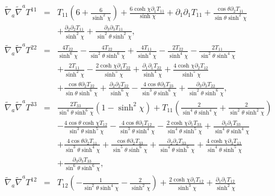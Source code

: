 \begin{eqnarray}
\tilde{\nabla}_a\tilde{\nabla}^aT^{11}&=& T_{11} \left(6 + \frac{6}{\sinh^2\chi}\right) + \frac{6 \cosh\chi \partial_{1}T_{11}}{\sinh\chi} + \partial_{1}\partial_{1}T_{11} + \frac{\cos\theta \partial_{2}T_{11}}{\sin\theta \sinh^2\chi} 
\nonumber\\
&&+ \frac{\partial_{2}\partial_{2}T_{11}}{\sinh^2\chi} + \frac{\partial_{3}\partial_{3}T_{11}}{\sin^2\theta \sinh^2\chi},
\nonumber\\ 
\tilde{\nabla}_a\tilde{\nabla}^aT^{22}&=& \frac{4 T_{22}}{\sinh^6\chi} -  \frac{4 T_{22}}{\sin^2\theta \sinh^6\chi} + \frac{4 T_{11}}{\sinh^4\chi} -  \frac{2 T_{22}}{\sinh^4\chi} -  \frac{2 T_{11}}{\sin^2\theta \sinh^4\chi} 
\nonumber\\
&&+ \frac{2 T_{11}}{\sinh^2\chi} -  \frac{2 \cosh\chi \partial_{1}T_{22}}{\sinh^5\chi} + \frac{\partial_{1}\partial_{1}T_{22}}{\sinh^4\chi} + \frac{4 \cosh\chi \partial_{2}T_{12}}{\sinh^5\chi} 
\nonumber\\
&&+ \frac{\cos\theta \partial_{2}T_{22}}{\sin\theta \sinh^6\chi} 
+ \frac{\partial_{2}\partial_{2}T_{22}}{\sinh^6\chi} -  \frac{4 \cos\theta \partial_{3}T_{23}}{\sin^3\theta \sinh^6\chi} 
+ \frac{\partial_{3}\partial_{3}T_{22}}{\sin^2\theta \sinh^6\chi},
\nonumber\\ 
\tilde{\nabla}_a\tilde{\nabla}^aT^{33}&=& \frac{2T_{33}} {\sin^4\theta\sinh^6\chi}\left(1-{\sinh^2\chi}\right) + T_{11} \left(\frac{2}{\sin^4\theta \sinh^4\chi} + \frac{2}{\sin^2\theta \sinh^2\chi}\right) 
\nonumber\\
&&-  \frac{4 \cos\theta \cosh\chi T_{12}}{\sin^3\theta \sinh^5\chi} 
 -  \frac{4 \cos\theta \partial_{1}T_{12}}{\sin^3\theta \sinh^4\chi} -  \frac{2 \cosh\chi \partial_{1}T_{33}}{\sin^4\theta \sinh^5\chi} + \frac{\partial_{1}\partial_{1}T_{33}}{\sin^4\theta \sinh^4\chi} 
 \nonumber\\
 &&+ \frac{4 \cos\theta \partial_{2}T_{11}}{\sin^3\theta \sinh^4\chi} + \frac{\cos\theta \partial_{2}T_{33}}{\sin^5\theta \sinh^6\chi}  + \frac{\partial_{2}\partial_{2}T_{33}}{\sin^4\theta \sinh^6\chi} + \frac{4 \cosh\chi \partial_{3}T_{13}}{\sin^4\theta \sinh^5\chi} 
 \nonumber\\
 &&+ \frac{\partial_{3}\partial_{3}T_{33}}{\sin^6\theta \sinh^6\chi},
\nonumber\\ 
\tilde{\nabla}_a\tilde{\nabla}^aT^{12}&=& T_{12} \left(- \frac{1}{\sin^2\theta \sinh^4\chi} -  \frac{2}{\sinh^2\chi}\right)
 + \frac{2 \cosh\chi \partial_{1}T_{12}}{\sinh^3\chi} + \frac{\partial_{1}\partial_{1}T_{12}}{\sinh^2\chi} 

\end{eqnarray}

